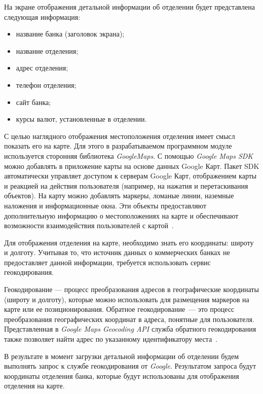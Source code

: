 На экране отображения детальной информации об отделении будет представлена
следующая информация:
\begin{itemize}
  \item название банка (заголовок экрана);
  \item название отделения;
  \item адрес отделения;
  \item телефон отделения;
  \item сайт банка;
  \item курсы валют, установленные в отделении.
\end{itemize}

С целью наглядного отображения местоположения отделения имеет смысл показать
его на карте. Для этого в разрабатываемом программном модуле используется
сторонняя библиотека \textit{GoogleMaps}. С помощью \textit{Google Maps SDK}
можно добавлять в приложение карты на основе данных Google Карт.
Пакет SDK автоматически управляет доступом к серверам Google Карт,
отображением карты и реакцией на действия пользователя (например, на нажатия
и перетаскивания объектов). На карту можно добавлять маркеры,
ломаные линии, наземные наложения и информационные окна. Эти объекты
предоставляют дополнительную информацию о местоположениях на карте и
обеспечивают возможности взаимодействия пользователей с
картой~\cite{google_maps_ios}.

Для отображения отделения на карте, необходимо знать его координаты:
широту и долготу. Учитывая то, что источник данных о коммерческих
банках не предоставляет данной информации, требуется использовать сервис геокодирования.

Геокодирование --- процесс преобразования адресов в географические
координаты (широту и долготу), которые можно использовать для размещения
маркеров на карте или ее позиционирования.
Обратное геокодирование~--- это процесс преобразования географических координат
в адреса, понятные для пользователя. Представленная в \textit{Google Maps Geocoding API}
служба обратного геокодирования также позволяет найти адрес по указанному
идентификатору места~\cite{google_geocoding}.

В результате в момент загрузки детальной информации об отделении будем выполнять
запрос к службе геокодирования от \textit{Google}. Результатом запроса будут
координаты отделения банка, которые будут использованы для отображения отделения
на карте.

\newpage

